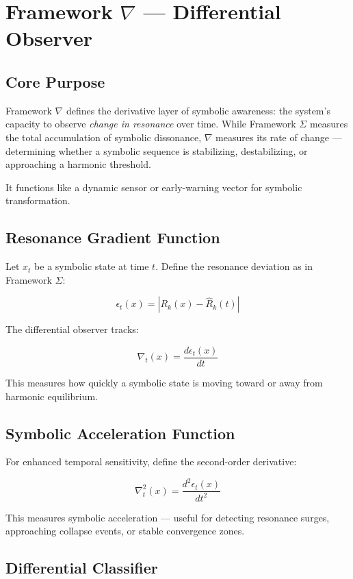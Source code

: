 \section*{Framework $\nabla$ — Differential Observer}

\subsection*{Core Purpose}

Framework $\nabla$ defines the derivative layer of symbolic awareness: the system’s capacity to observe \emph{change in resonance} over time. While Framework $\Sigma$ measures the total accumulation of symbolic dissonance, $\nabla$ measures its rate of change — determining whether a symbolic sequence is stabilizing, destabilizing, or approaching a harmonic threshold.

It functions like a dynamic sensor or early-warning vector for symbolic transformation.

\subsection*{Resonance Gradient Function}

Let $x_t$ be a symbolic state at time $t$. Define the resonance deviation as in Framework $\Sigma$:

\[
\epsilon_t(x) = |R_k(x) - \hat{R}_k(t)|
\]

The differential observer tracks:

\[
\nabla_t(x) = \frac{d\epsilon_t(x)}{dt}
\]

This measures how quickly a symbolic state is moving toward or away from harmonic equilibrium.

\subsection*{Symbolic Acceleration Function}

For enhanced temporal sensitivity, define the second-order derivative:

\[
\nabla^2_t(x) = \frac{d^2\epsilon_t(x)}{dt^2}
\]

This measures symbolic acceleration — useful for detecting resonance surges, approaching collapse events, or stable convergence zones.

\subsection*{Differential Classifier}

